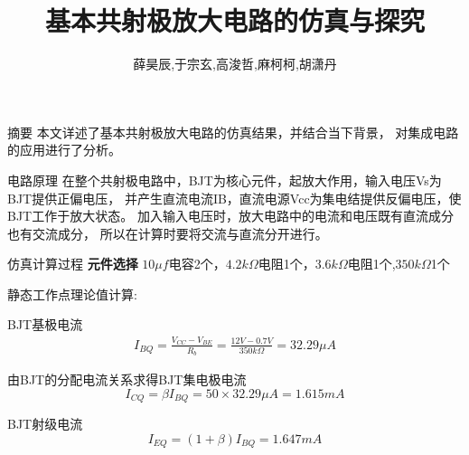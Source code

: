 \documentclass[UTF8]{ctexbeamer}
\title{基本共射极放大电路的仿真与探究}
\author{薛昊辰,于宗玄,高浚哲,麻柯柯,胡潇丹}
\begin{document}
  
  \begin{frame}
    \maketitle
  \end{frame}

  \begin{frame}{摘要}
    本文详述了基本共射极放大电路的仿真结果，并结合当下背景，
对集成电路的应用进行了分析。
  \end{frame}

  \begin{frame}{电路原理}
    在整个共射极电路中，BJT为核心元件，起放大作用，输入电压Vs为BJT提供正偏电压，
并产生直流电流IB，直流电源Vcc为集电结提供反偏电压，使BJT工作于放大状态。
加入输入电压时，放大电路中的电流和电压既有直流成分也有交流成分，
所以在计算时要将交流与直流分开进行。
  \end{frame}

  \begin{frame}{仿真计算过程}
    \textbf{元件选择}
    $10\mu f$电容2个，$4.2k\Omega$电阻1个，$3.6k\Omega$电阻1个,$350k\Omega$1个

    静态工作点理论值计算:

BJT基极电流
\begin{equation}
  \begin{split}
    I_{BQ}=\frac{V_{CC}-V_{BE}}{R_b}=\frac{12V-0.7V}{350k\Omega}=32.29\mu A
  \end{split}
\end{equation}

由BJT的分配电流关系求得BJT集电极电流
\begin{equation}
  I_{CQ}=\beta I_{BQ}=50\times32.29\mu A=1.615mA
\end{equation}

BJT射级电流
\begin{equation}
  I_{EQ}=(1+\beta)I_{BQ}=1.647mA
\end{equation}

  \end{frame}
\end{document}
